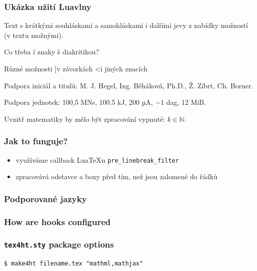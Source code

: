 \begin{frame}
  \frametitle{Ukázka užití Luavlny}
  \begin{minipage}{3in}

    \preventsingledebugon

    Text s krátkými souhláskami a samohláskami i dalšími jevy
    z nabídky možností (v textu možnými).

    Co třeba í znaky š diakritikou?

    Různé možnosti [v závorkách \textless i jiných znacích

    Podpora iniciál a titulů: M. J. Hegel, Ing. Běháková, Ph.D., Ž. Zíbrt,
    Ch. Borner.

    Podpora jednotek: 100,5 MN\cdot{}s, 100.5 kJ, 200 µA, $-1$ dag,
    12 MiB.

    Uvnitř matematiky by mělo být zpracování vypnuté: $k \in \mathbb N$.

    \preventsingledebugoff
  \end{minipage}
\end{frame}

\begin{frame}[fragile]
  \frametitle{Jak to funguje?}
  
  \begin{itemize}
    \item využíváme callback Lua\TeX u \verb|pre_linebreak_filter|
    \item zpracovává odstavce a boxy před tím, než jsou zalomené do řádků
  \end{itemize}

\end{frame}

\begin{frame}[fragile]
  \frametitle{Podporované jazyky}

\end{frame}

\begin{frame}
  \frametitle{How are hooks configured}
\end{frame}

\begin{frame}[fragile]
  \frametitle{\texttt{tex4ht.sty} package options}
  \begin{priklad}
\begin{verbatim}
$ make4ht filename.tex "mathml,mathjax"
\end{verbatim}
\end{priklad}
\end{frame}

